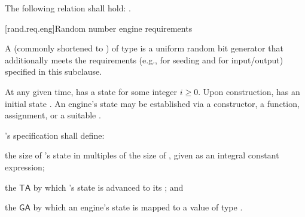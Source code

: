 \pnum
The following relation shall hold:
.
%



[rand.req.eng]{Random number engine requirements}%
%

\pnum
A 
(commonly shortened to )
 of type 
is a uniform random bit generator
that additionally meets the requirements
(e.g., for seeding and for input/output)
specified in this subclause.

\pnum
At any given time,
 has a state 
for some integer $i \geq 0$.
Upon construction,
has an initial state .
An engine's state may be established via
 a constructor,
 a  function,
 assignment,
 or a suitable .

\pnum
{}'s specification shall define:
\begin{enumeratea}
 \item
   the size of 's state
   in multiples of the size of ,
   given as an integral constant expression;
 \item
   the 
   $\mathsf{TA}$
   by which 's state 
   is advanced to its 
   ;
 and
 \item
   the 
   $\mathsf{GA}$
   by which an engine's state is mapped
   to a value of type .
\end{enumeratea}

